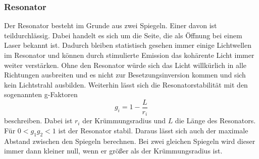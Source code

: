 \subsubsection*{Resonator}
Der Resonator besteht im Grunde aus zwei Spiegeln.
Einer davon ist teildurchlässig. Dabei handelt es sich um die Seite, die als Öffnung bei einem Laser bekannt ist.
Dadurch bleiben statistisch gesehen immer einige Lichtwellen im Resonator und können durch stimulierte Emission das kohärente Licht immer weiter verstärken.
Ohne den Resonator würde sich das Licht willkürlich in alle Richtungen ausbreiten und es nicht zur Besetzungsinversion kommen und sich kein Lichtstrahl ausbilden.
Weiterhin lässt sich die Resonatorstabilität mit den sogenannten g-Faktoren 
\begin{equation} \label{eq:gfaktor}
    g_i = 1 - \frac{L}{r_i}
\end{equation}
beschreiben. Dabei ist $r_i$ der Krümmungsradius und $L$ die Länge des Resonators.
Für $0 < g_1 g_2 < 1$ ist der Resonator stabil.
Daraus lässt sich auch der maximale Abstand zwischen den Spiegeln berechnen.
Bei zwei gleichen Spiegeln wird dieser immer dann kleiner null, wenn er größer als der Krümmungsradius ist.

